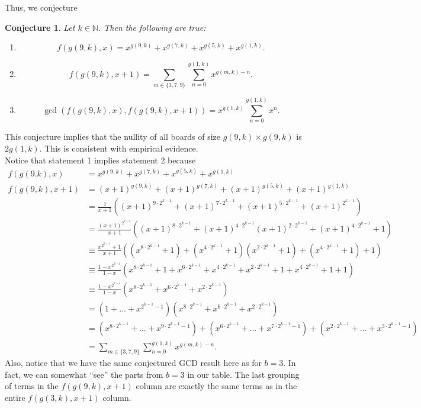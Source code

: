 \documentclass{article}
\newtheorem{conjecture}{Conjecture}
\newcommand{\N}{\mathbb{N}}
\begin{document}
	Thus, we conjecture
	\begin{conjecture}
		Let $k \in \N$.
		Then the following are true:
		\begin{enumerate}
			\item
			\begin{equation*}
				f(g(9,k),x) = x^{g(9,k)} + x^{g(7,k)} + x^{g(5,k)} + x^{g(1,k)}.
			\end{equation*}
			\item
			\begin{equation*}
				f(g(9,k),x+1) = \sum_{m\in\{3,7,9\}}{\sum_{n=0}^{g(1,k)}{x^{g(m,k)-n}}}.
			\end{equation*}
			\item
			\begin{equation*}
				\gcd\left(f(g(9,k),x),f(g(9,k),x+1)\right) = x^{g(1,k)}\sum_{n=0}^{g(1,k)}{x^n}.
			\end{equation*}
		\end{enumerate}
	\end{conjecture}
	This conjecture implies that the nullity of all boards of size $g(9,k) \times g(9,k)$ is $2g(1,k)$.
	This is consistent with empirical evidence. \\
	
	Notice that statement 1 implies statement 2 because
	\begin{align*}
		f(g(9.k),x) &= x^{g(9,k)} + x^{g(7,k)} + x^{g(5,k)} + x^{g(1,k)} \\
		f(g(9,k),x+1) &= (x+1)^{g(9,k)} + (x+1)^{g(7,k)} + (x+1)^{g(5,k)} + (x+1)^{g(1,k)} \\
		&= \frac{1}{x+1}\left((x+1)^{9\cdot2^{k-1}} + (x+1)^{7\cdot2^{k-1}} + (x+1)^{5\cdot2^{k-1}} + (x+1)^{2^{k-1}}\right) \\
		&= \frac{(x+1)^{2^{k-1}}}{x+1}\left((x+1)^{8\cdot2^{k-1}} + (x+1)^{4\cdot2^{k-1}}(x+1)^{2\cdot2^{k-1}} + (x+1)^{4\cdot2^{k-1}} + 1\right) \\
		&\equiv \frac{x^{2^{k-1}}+1}{x+1}\left(\left(x^{8\cdot2^{k-1}}+1\right) + \left(x^{4\cdot2^{k-1}}+1\right)\left(x^{2\cdot2^{k-1}}+1\right) + \left(x^{4\cdot2^{k-1}}+1\right) + 1\right) \\
		&\equiv \frac{1-x^{2^{k-1}}}{1-x}\left(x^{8\cdot2^{k-1}} + 1 + x^{6\cdot2^{k-1}} + x^{4\cdot2^{k-1}} + x^{2\cdot2^{k-1}} + 1 + x^{4\cdot2^{k-1}} + 1 + 1\right) \\
		&\equiv \frac{1-x^{2^{k-1}}}{1-x}\left(x^{8\cdot2^{k-1}}+x^{6\cdot2^{k-1}}+x^{2\cdot2^{k-1}}\right) \\
		&= \left(1+\dots+x^{2^{k-1}-1}\right)\left(x^{8\cdot2^{k-1}}+x^{6\cdot2^{k-1}}+x^{2\cdot2^{k-1}}\right) \\
		&= \left(x^{8\cdot2^{k-1}}+\dots+x^{9\cdot2^{k-1}-1}\right) + \left(x^{6\cdot2^{k-1}}+\dots+x^{7\cdot2^{k-1}-1}\right) + \left(x^{2\cdot2^{k-1}}+\dots+x^{3\cdot2^{k-1}-1}\right) \\
		&= \sum_{m\in\{3,7,9\}}{\sum_{n=0}^{g(1,k)}{x^{g(m,k)-n}}}.
	\end{align*}
	Also, notice that we have the same conjectured GCD result here as for $b=3$.
	In fact, we can somewhat ``see'' the parts from $b=3$ in our table.
	The last grouping of terms in the $f(g(9,k),x+1)$ column are exactly the same terms as in the entire $f(g(3,k),x+1)$ column.
\end{document}
